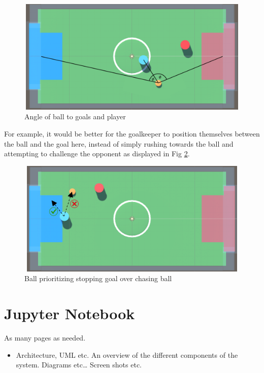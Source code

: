 \begin{figure}[H]
    \centering
    \includegraphics[width=115mm, height=55mm]{img/Image5.png}
    \caption{Angle of ball to goals and player}
    \label{fig:sd4}
\end{figure}

\begin{flushleft}
For example, it would be better for the goalkeeper to position themselves between the ball and the goal here, instead of simply rushing towards the ball and attempting to challenge the opponent as displayed in Fig \ref{fig:sd5}.
\end{flushleft}

\begin{figure}[H]
    \centering
    \includegraphics[width=115mm, height=55mm]{img/Image4.png}
    \caption{Ball prioritizing stopping goal over chasing ball}
    \label{fig:sd5}
\end{figure}

\section{Jupyter Notebook}



As many pages as needed.
\begin{itemize}
\item Architecture, UML etc. An overview of the different components of the system. Diagrams etc… Screen shots etc.
\end{itemize}

